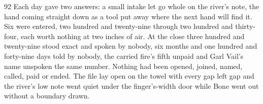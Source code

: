 \begin{CRchronicle}{92}
Each day gave two answers: a small intake let go whole on the river’s note, the hand coming straight down as a tool put away where the next hand will find it. Six were entered, two hundred and twenty-nine through two hundred and thirty-four, each worth nothing at two inches of air. At the close three hundred and twenty-nine stood exact and spoken by nobody, six months and one hundred and forty-nine days told by nobody, the carried fire’s fifth unpaid and Garl Vail’s name unspoken the same number. Nothing had been opened, joined, named, called, paid or ended. The file lay open on the towel with every gap left gap and the river’s low note went quiet under the finger’s-width door while Bone went out without a boundary drawn.
\end{CRchronicle}
